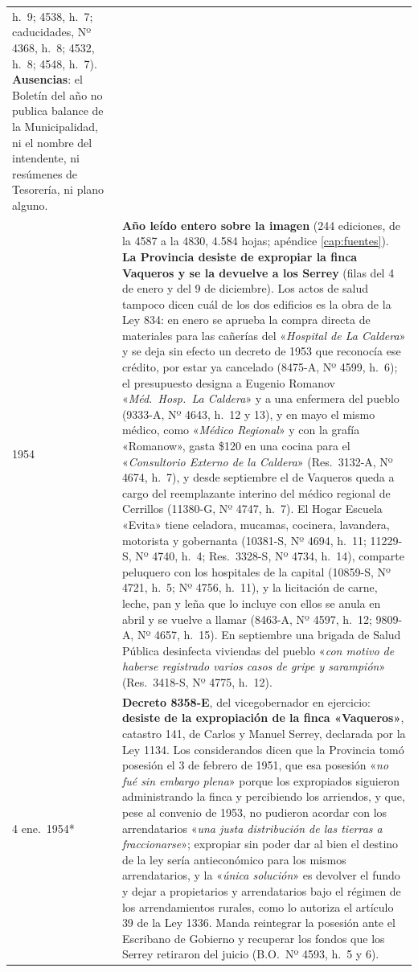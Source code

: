 \begin{longtable}{@{}p{2.7cm}p{10.3cm}@{}}
h.\ 9; 4538, h.\ 7; caducidades, Nº 4368, h.\ 8; 4532, h.\ 8; 4548, h.\ 7). \textbf{Ausencias}: el Boletín del año no publica balance de la Municipalidad, ni el nombre del intendente, ni resúmenes de Tesorería, ni plano alguno. \\
1954 & \textbf{Año leído entero sobre la imagen} (244 ediciones, de la 4587 a la 4830, 4.584 hojas; apéndice \ref{cap:fuentes}). \textbf{La Provincia desiste de expropiar la finca Vaqueros y se la devuelve a los Serrey} (filas del 4 de enero y del 9 de diciembre). Los actos de salud tampoco dicen cuál de los dos edificios es la obra de la Ley 834: en enero se aprueba la compra directa de materiales para las cañerías del «\textit{Hospital de La Caldera}» y se deja sin efecto un decreto de 1953 que reconocía ese crédito, por estar ya cancelado (8475-A, Nº 4599, h.\ 6); el presupuesto designa a Eugenio Romanov «\textit{Méd.\ Hosp.\ La Caldera}» y a una enfermera del pueblo (9333-A, Nº 4643, h.\ 12 y 13), y en mayo el mismo médico, como «\textit{Médico Regional}» y con la grafía «Romanow», gasta \$120 en una cocina para el «\textit{Consultorio Externo de la Caldera}» (Res.\ 3132-A, Nº 4674, h.\ 7), y desde septiembre el de Vaqueros queda a cargo del reemplazante interino del médico regional de Cerrillos (11380-G, Nº 4747, h.\ 7). El Hogar Escuela «Evita» tiene celadora, mucamas, cocinera, lavandera, motorista y gobernanta (10381-S, Nº 4694, h.\ 11; 11229-S, Nº 4740, h.\ 4; Res.\ 3328-S, Nº 4734, h.\ 14), comparte peluquero con los hospitales de la capital (10859-S, Nº 4721, h.\ 5; Nº 4756, h.\ 11), y la licitación de carne, leche, pan y leña que lo incluye con ellos se anula en abril y se vuelve a llamar (8463-A, Nº 4597, h.\ 12; 9809-A, Nº 4657, h.\ 15). En septiembre una brigada de Salud Pública desinfecta viviendas del pueblo «\textit{con motivo de haberse registrado varios casos de gripe y sarampión}» (Res.\ 3418-S, Nº 4775, h.\ 12). \\
4 ene.\ 1954* & \textbf{Decreto 8358-E}, del vicegobernador en ejercicio: \textbf{desiste de la expropiación de la finca «Vaqueros»}, catastro 141, de Carlos y Manuel Serrey\index{Serrey, Manuel}, declarada por la Ley 1134. Los considerandos dicen que la Provincia tomó posesión el 3 de febrero de 1951, que esa posesión «\textit{no fué sin embargo plena}» porque los expropiados siguieron administrando la finca y percibiendo los arriendos, y que, pese al convenio de 1953, no pudieron acordar con los arrendatarios «\textit{una justa distribución de las tierras a fraccionarse}»; expropiar sin poder dar al bien el destino de la ley sería antieconómico para los mismos arrendatarios, y la «\textit{única solución}» es devolver el fundo y dejar a propietarios y arrendatarios bajo el régimen de los arrendamientos rurales, como lo autoriza el artículo 39 de la Ley 1336. Manda reintegrar la posesión ante el Escribano de Gobierno y recuperar los fondos que los Serrey retiraron del juicio (B.O.\ Nº 4593, h.\ 5 y 6). \\

\end{longtable}
